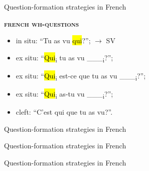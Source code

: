 \documentclass[lesson_slides]{subfiles}
\begin{document}
\begin{frame}[c]{Question-formation strategies in French}

    \noindent \textbf{\textsc{french wh-questions}}
    \begin{itemize}
        \item[\ding{227}] in situ: “Tu as vu \hl{qui}?”; $\longrightarrow$ SV
        \item[\ding{227}] ex situ: “\hl{Qui}\textsubscript{i} tu as vu \_\_\_\textsubscript{i}?”;
        \item[\ding{227}] ex situ: “\hl{Qui}\textsubscript{i} est-ce que tu as vu \_\_\_\textsubscript{i}?”; 
        \item[\ding{227}] ex situ: “\hl{Qui}\textsubscript{i} as-tu vu \_\_\_\textsubscript{i}?”;
        \item[\ding{227}] cleft: “C’est qui que tu as vu?”.
    \end{itemize}
   
\end{frame}
\begin{frame}[c]{Question-formation strategies in French}

   
\end{frame}
\begin{frame}[c]{Question-formation strategies in French}

   
\end{frame}
\begin{frame}[c]{Question-formation strategies in French}

   
\end{frame}
\end{document}
